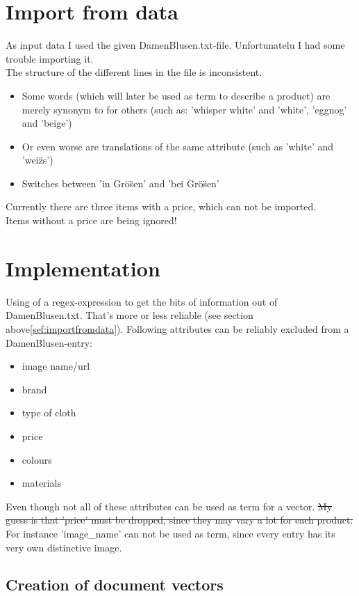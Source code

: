 

\section{Import from data}
\label{sec:importfromdata}
As input data I used the given DamenBlusen.txt-file.
Unfortunatelu I had some trouble importing it.\\
The structure of the different lines in the file is inconsistent.
\begin{itemize}
    \item Some words (which will later be used as term to describe a product) are merely synonym to for others (such as: 'whisper white' and 'white', 'eggnog' and 'beige')
    \item Or even worse are translations of the same attribute (such as 'white' and 'wei\"zs')
    \item Switches between 'in Gr\"o\"sen' and 'bei Gr\"o\"sen'
\end{itemize}
Currently there are three items with a price, which can not be imported.\\
Items without a price are being ignored!


\section{Implementation}
Using of a regex-expression to get the bits of information out of DamenBlusen.txt.
That's more or less reliable (see section above\ref{sef:importfromdata}).
Following attributes can be reliably excluded from a DamenBlusen-entry:
\begin{itemize}
    \item image name/url
    \item brand
    \item type of cloth
    \item price
    \item colours
    \item materials
\end{itemize}

\medskip
Even though not all of these attributes can be used as term for a vector.
\sout{My guess is that 'price' must be dropped, since they may vary a lot for each product.}
For instance 'image\_name' can not be used as term, since every entry has its very own distinctive image.

\subsection{Creation of document vectors}

